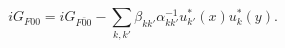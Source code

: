 \begin{equation}
iG_{F00}= iG_{F\bar{0}{0}} - \sum_{k,k'} \beta_{kk'}\alpha^{-1}_{kk'} u_{k'}^*(x)u_k^*(y) .
\end{equation}


